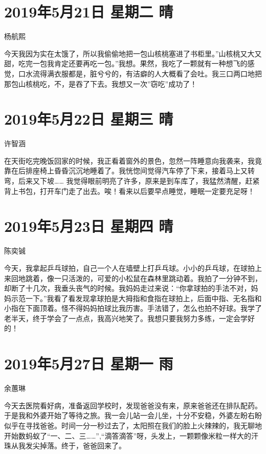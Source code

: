 \section{2019年5月21日 星期二 晴}

杨航熙

今天我因为实在太饿了，所以我偷偷地把一包山核桃塞进了书柜里。”山核桃又大又甜，吃完一包我肯定还要再吃一包。”我想。果然，我吃了一颗就有一种想飞的感觉，口水流得满衣服都是，脏兮兮的，有洁癖的人大概看了会吐。我三口两口地把那包山核桃吃，不，是吞了下去。我想又一次”窃吃”成功了！

\section{2019年5月22日 星期三 晴}

许智涵

在天街吃完晚饭回家的时候，我正看着窗外的景色，忽然一阵睡意向我袭来，我竟靠在后排座椅上昏昏沉沉地睡着了。我恍惚间觉得汽车停了下来，接着马上又转弯，后来又下坡…… 我觉得眼前明亮了许多，原来是到车库了，我猛然清醒，赶紧背上书包，打开车门走了出去。唉！看来以后要早点睡觉，睡眠一定要充足呀！

\section{2019年5月23日 星期四 晴}

陈奕铖

今天，我拿起乒乓球拍，自己一个人在墙壁上打乒乓球。小小的乒乓球，在球拍上来回地跳着，像一只活泼的，可爱的小松鼠在森林里跳动着。我拍了一分钟不到，却断了十几次，我垂头丧气的时候。我妈妈走过来说：“你拿球拍的手法不对，妈妈示范一下。”我看了看发现拿球拍是大拇指和食指在球拍上，后面中指、无名指和小指在下面顶着。怪不得妈妈拍球比我历害。手法错了，怎么也拍不好球。我学了老半天，终于学会了一点点，我高兴地笑了。我想只要我努力多练，一定会学好的！

\section{2019年5月27日 星期一 雨}

余蕙琳

今天去医院看好病，准备返回学校时，发现爸爸没有来，原来爸爸还在排队配药。于是我和外婆开始了等待之旅。我一会儿站一会儿坐，十分不安稳，外婆左盼右盼似乎在寻找爸爸。时间一分一秒过去了，太阳照在我们的脸上火辣辣的，我无聊地开始数蚂蚁了“一、二、三……”,“滴答滴答”呀，头发上，一颗颗像米粒一样大的汗珠从我发尖掉落。终于，爸爸回来了。

